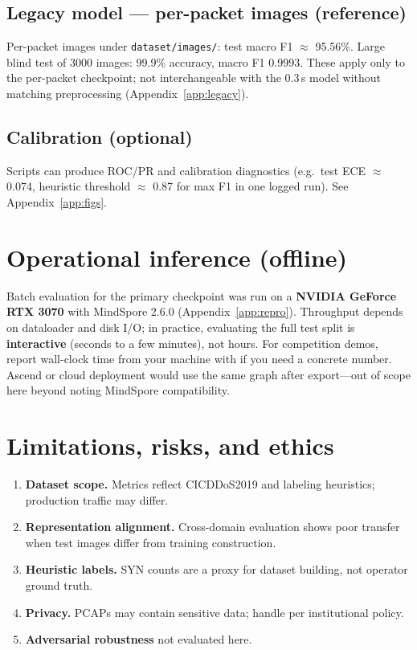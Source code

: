 \documentclass[11pt,a4paper]{article}
\begin{document}
\subsection{Legacy model --- per-packet images (reference)}

Per-packet images under \texttt{dataset/images/}: test macro F1 $\approx$ 95.56\%. Large blind test of 3000 images: 99.9\% accuracy, macro F1 0.9993. These apply only to the per-packet checkpoint; not interchangeable with the 0.3\,s model without matching preprocessing (Appendix~\ref{app:legacy}).

\subsection{Calibration (optional)}

Scripts can produce ROC/PR and calibration diagnostics (e.g.\ test ECE $\approx$ 0.074, heuristic threshold $\approx$ 0.87 for max F1 in one logged run). See Appendix~\ref{app:figs}.

\section{Operational inference (offline)}

Batch evaluation for the primary checkpoint was run on a \textbf{NVIDIA GeForce RTX 3070} with MindSpore 2.6.0 (Appendix~\ref{app:repro}). Throughput depends on dataloader and disk I/O; in practice, evaluating the full test split is \textbf{interactive} (seconds to a few minutes), not hours. For competition demos, report wall-clock time from your machine with  if you need a concrete number. Ascend or cloud deployment would use the same graph after export---out of scope here beyond noting MindSpore compatibility.

\section{Limitations, risks, and ethics}

\begin{enumerate}[leftmargin=*]
  \item \textbf{Dataset scope.} Metrics reflect CICDDoS2019 and labeling heuristics; production traffic may differ.
  \item \textbf{Representation alignment.} Cross-domain evaluation shows poor transfer when test images differ from training construction.
  \item \textbf{Heuristic labels.} SYN counts are a proxy for dataset building, not operator ground truth.
  \item \textbf{Privacy.} PCAPs may contain sensitive data; handle per institutional policy.
  \item \textbf{Adversarial robustness} not evaluated here.
\end{enumerate}
\end{document}
